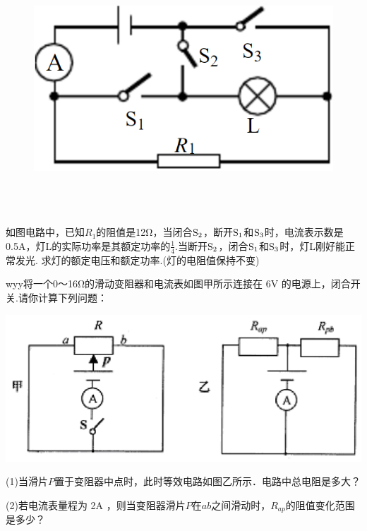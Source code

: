 \documentclass[11pt,a4paper]{article}
\newcommand{\nianfen}[1]{\hspace{-2em}{(#1\textbf{·}\textit{青岛})}}
\begin{document}
	\rule{0em}{10em}
	
	\begin{figure}
		\includegraphics[width=\linewidth]{2006}
		
	\end{figure}
	
	\mbox{}\\
	
		\mbox{}\\
		
			\mbox{}\\
	
	\nianfen{2006}如图电路中，已知$ R_1 $的阻值是12Ω，当闭合$\rm S_2 $，断开$\rm S_1 $和$\rm S_3 $时，电流表示数是0.5A，灯L的实际功率是其额定功率的$\frac{1}{4}$.当断开$\rm S_2 $，闭合$\rm S_1 $和$\rm S_3 $时，灯L刚好能正常发光. 求灯的额定电压和额定功率.(灯的电阻值保持不变)
	\clearpage
	
	\nianfen{2005}wyy将一个0～16Ω的滑动变阻器和电流表如图甲所示连接在 6V 的电源上，闭合开
	关.请你计算下列问题：
	
	\begin{center}
		\includegraphics[width=0.7\linewidth]{2005}
	\end{center}
	
	(1)当滑片$  P  $\/置于变阻器中点时，此时等效电路如图乙所示．电路中总电阻是多大？
	
	(2)若电流表量程为 2A ，则当变阻器滑片$  P  $在$ab$之间滑动时，$ R_{ap}  $的阻值变化范围是多少？
	
\end{document}
